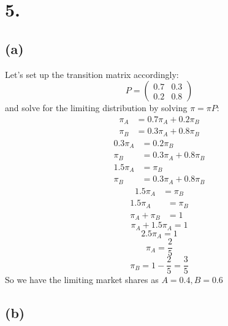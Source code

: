 \documentclass{article}
\begin{document}
{\Large 

\section*{5.}

\subsection*{(a)} 

Let's set up the transition matrix accordingly:
\[
  P = 
  \begin{pmatrix}
    0.7 & 0.3 \\
    0.2 & 0.8 
  \end{pmatrix}
\]
and solve for the limiting distribution by solving \(\pi = \pi P\):
\begin{align*}
  \pi_A &= 0.7\pi_A + 0.2\pi_B \\
  \pi_B &= 0.3\pi_A + 0.8\pi_B
\end{align*}
\begin{align*}
  0.3\pi_A &= 0.2\pi_B \\
  \pi_B &= 0.3\pi_A + 0.8\pi_B
\end{align*}
\begin{align*}
  1.5\pi_A &= \pi_B \\
  \pi_B &= 0.3\pi_A + 0.8\pi_B
\end{align*}
\begin{align*}
  1.5\pi_A &= \pi_B
\end{align*}
\begin{align*}
  1.5\pi_A &= \pi_B \\
  \pi_A + \pi_B &= 1
\end{align*}
\[
  \pi_A + 1.5\pi_A = 1
\]
\[
  2.5\pi_A = 1
\]
\[
  \pi_A = \frac{2}{5}
\]
\[
  \pi_B = 1 - \frac{2}{5} = \frac{3}{5}
\]
So we have the limiting market shares as \(\boxed{A = 0.4, B = 0.6}\)

\subsection*{(b)}

}
\end{document}
